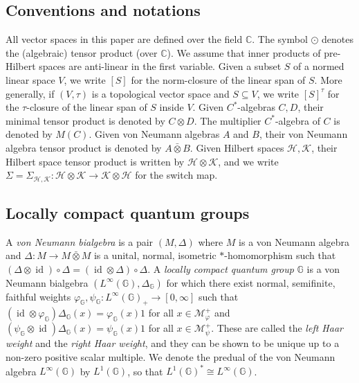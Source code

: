 \documentclass[reqno]{amsart}
\numberwithin{equation}{section}
\DeclareMathOperator{\id}{\mathrm{id}}
\newcommand{\mcH}{\mathcal{H}}
\newcommand{\mcK}{\mathcal{K}}
\newcommand{\C}{\mathbb{C}}
\newcommand{\G}{\mathbb{G}}
\newcommand{\ovot}{\bar{\otimes}}
\begin{document}
\subsection{Conventions and notations} All vector spaces in this paper are defined over the field $\C$. The symbol $\odot$ denotes the (algebraic) tensor product (over $\C$). We assume that inner products of pre-Hilbert spaces are anti-linear in the first variable. Given a subset $S$ of a normed linear space $V$, we write $[S]$ for the norm-closure of the linear span of $S$. More generally, if $(V, \tau)$ is a topological vector space and $S\subseteq V$, we write $[S]^\tau$ for the $\tau$-closure of the linear span of $S$ inside $V$. Given $C^*$-algebras $C,D$, their minimal tensor product is denoted by $C\otimes D$. The multiplier $C^*$-algebra of $C$ is denoted by $M(C)$. Given von Neumann algebras $A$ and $B$, their von Neumann algebra tensor product is denoted by $A \ovot B$.  Given Hilbert spaces $\mcH, \mcK$, their Hilbert space tensor product is written by $\mcH\otimes \mcK$, and we write $\Sigma= \Sigma_{\mcH, \mcK}: \mcH\otimes \mcK\to \mcK\otimes \mcH$ for the switch map. 

\subsection{Locally compact quantum groups} \cites{KV00, KV03, VV03} A \emph{von Neumann bialgebra} is a pair $(M, \Delta)$ where $M$ is a von Neumann algebra and $\Delta: M \to M \ovot M$ is a unital, normal, isometric $*$-homomorphism such that $(\Delta \otimes \id)\circ \Delta = (\id \otimes \Delta)\circ \Delta$. A \emph{locally compact quantum group} $\G$ is a von Neumann bialgebra $(L^\infty(\G), \Delta_\G)$ for which there exist normal, semifinite, faithful weights $\varphi_\G, \psi_\G: L^\infty(\G)_+\to [0, \infty]$ such that $(\id\otimes \varphi_\G)\Delta_\G(x)= \varphi_\G(x)1$ for all $x\in \mathscr{M}_\varphi^+$ and $(\psi_\G\otimes \id)\Delta_\G(x)= \psi_\G(x)1$ for all $x\in \mathscr{M}_\psi^+$. These are called the \emph{left Haar weight} and the \emph{right Haar weight}, and they can be shown to be unique up to a non-zero positive scalar multiple. We denote the predual of the von Neumann algebra $L^\infty(\G)$ by $L^1(\G)$, so that $L^1(\G)^*\cong L^\infty(\G)$.
\end{document}
